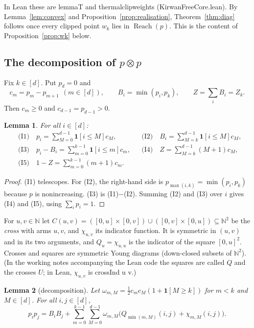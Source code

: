\documentclass[11pt]{amsart}
\newtheorem{lemma}{Lemma}[section]
\theoremstyle{definition}
\theoremstyle{remark}
\numberwithin{equation}{section}
\newcommand{\N}{\mathbb{N}}
\newcommand{\Reach}{\operatorname{Reach}}
\newcommand{\ind}[1]{\mathbf{1}[#1]}
\newcommand{\leanus}{\textunderscore\allowbreak}
\newcommand{\lean}[1]{{\ttfamily\let\_\leanus #1}}
\begin{document}
In Lean these are \lean{lemmaT} and \lean{thermal\_clip\_weights} (\lean{KirwanFreeCore.lean}).
By Lemma~\ref{lem:convex} and Proposition~\ref{prop:realisation}, Theorem~\ref{thm:diag} follows once
every clipped point $w_k$ lies in $\Reach(p)$. This is the content of Proposition~\ref{prop:wk} below.

\subsection{The decomposition of \texorpdfstring{$p\otimes p$}{p x p}}
Fix $k\in[d]$. Put $p_d=0$ and
\[
  c_m=p_m-p_{m+1}\ \ (m\in[d]),\qquad B_i=\min(p_i,p_k),\qquad Z=\sum_iB_i=Z_k .
\]
Then $c_m\ge0$ and $c_{d-1}=p_{d-1}>0$.

\begin{lemma}\label{lem:telescope}
For all $i\in[d]$:
\begin{align*}
&\text{(I1)}\quad p_i=\sum_{M=0}^{d-1}\ind{i\le M}c_M, &&\text{(I2)}\quad B_i=\sum_{M=k}^{d-1}\ind{i\le M}c_M,\\
&\text{(I3)}\quad p_i-B_i=\sum_{m=0}^{k-1}\ind{i\le m}c_m, &&\text{(I4)}\quad Z=\sum_{M=k}^{d-1}(M+1)c_M,\\
&\text{(I5)}\quad 1-Z=\sum_{m=0}^{k-1}(m+1)c_m .
\end{align*}
\end{lemma}

\begin{proof}
(I1) telescopes. For (I2), the right-hand side is $p_{\max(i,k)}=\min(p_i,p_k)$ because $p$ is
nonincreasing. (I3) is (I1)$-$(I2). Summing (I2) and (I3) over $i$ gives (I4) and (I5), using
$\sum_ip_i=1$.
\end{proof}

For $u,v\in\N$ let $C(u,v)=([0,u]\times[0,v])\cup([0,v]\times[0,u])\subseteq\N^2$ be the \emph{cross}
with arms $u,v$, and $\chi_{u,v}$ its indicator function. It is symmetric in $(u,v)$ and in its two
arguments, and $Q_u=\chi_{u,u}$ is the indicator of the square $[0,u]^2$. Crosses and squares are
symmetric Young diagrams (down-closed subsets of $\N^2$). (In the working notes accompanying the Lean
code the squares are called $Q$ and the crosses $U$; in Lean, $\chi_{u,v}$ is \lean{crossInd u v}.)

\begin{lemma}[decomposition]\label{lem:decomp}
Let $\omega_{m,M}=\tfrac12c_mc_M(1+\ind{M\ge k})$ for $m<k$ and $M\in[d]$. For all $i,j\in[d]$,
\[
  p_ip_j=B_iB_j+\sum_{m=0}^{k-1}\sum_{M=0}^{d-1}\omega_{m,M}\bigl(Q_{\min(m,M)}(i,j)+\chi_{m,M}(i,j)\bigr) .
\]
\end{lemma}
\end{document}
